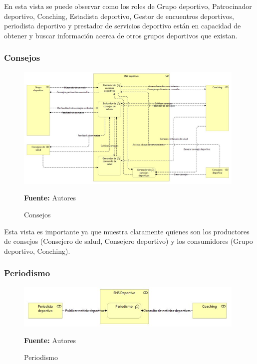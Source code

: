 En esta vista se puede observar como los roles de Grupo deportivo, Patrocinador deportivo, Coaching, Estadista deportivo, Gestor de encuentros deportivos, periodista deportivo y prestador de servicios deportivo están en capacidad de obtener y buscar información acerca de otros grupos deportivos que existan.

\subsubsection{Consejos}

\begin{figure}[!htb]
  \begin{center}
    \includegraphics[width=11cm]{./imagenes/Archimate/vistas/business_functions/Consejos.png}
    \caption{Consejos}
    \label{fig:BF_Consejos}
    \textbf{Fuente:}  Autores
  \end{center}
\end{figure}

Esta vista es importante ya que muestra claramente quienes son los productores de consejos (Consejero de salud, Consejero deportivo) y los consumidores (Grupo deportivo, Coaching).

\subsubsection{Periodismo}

\begin{figure}[!htb]
  \begin{center}
    \includegraphics[width=11cm]{./imagenes/Archimate/vistas/business_functions/Periodismo.png}
    \caption{Periodismo}
    \label{fig:BF_Periodismo}
    \textbf{Fuente:}  Autores
  \end{center}
\end{figure}

